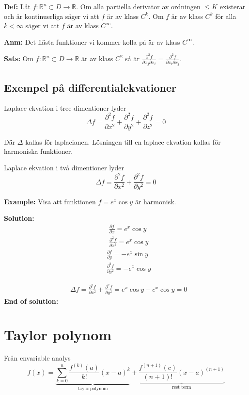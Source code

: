\textbf{Def:} 
Låt $f: \mathbb{R}^n\subset D\to\mathbb{R}$. Om alla 
partiella derivator av ordningen $\leq K$ existerar 
och är kontinuerliga säger vi att $f$ är av klass $C^k$.
Om $f$ är av klass $C^k$ för alla $k<\infty$ säger vi att 
$f$ är av klass $C^\infty$.

\textbf{Anm:} 
Det flästa funktioner vi kommer kolla på är av klass $C^\infty$.

\textbf{Sats:} 
Om $f: \mathbb{R}^n\subset D\to\mathbb{R}$ är av klass $C^2$ 
så är $\frac{\partial^2 f}{\partial x_j\partial x_i} = \frac{\partial^2 f}{\partial x_i\partial x_j}$.

\subsection{Exempel på differentialekvationer}
Laplace ekvation i tree dimentioner lyder
\begin{equation*}
    \Delta f = \frac{\partial^2 f}{\partial x^2} + \frac{\partial^2 f}{\partial y^2} + \frac{\partial^2 f}{\partial z^2} = 0
\end{equation*}

Där $\Delta$ kallas för laplacianen.
Lösningen till en laplace ekvation kallas för harmoniska 
funktioner.

Laplace ekvation i två dimentioner lyder
\begin{equation*}
    \Delta f = \frac{\partial^2 f}{\partial x^2} + \frac{\partial^2 f}{\partial y^2} = 0
\end{equation*}

\textbf{Example:} 
Visa att funktionen $f = e^x \cos{y}$ är harmonisk.

\textbf{Solution:} 
\begin{align*}
    &\frac{\partial f}{\partial x} = e^x \cos{y} \\
    &\frac{\partial^2 f}{\partial x^2} = e^x \cos{y}
\end{align*}
\begin{align*}
    &\frac{\partial f}{\partial y} = -e^x \sin{y} \\
    &\frac{\partial^2 f}{\partial y^2} = -e^x \cos{y}
\end{align*}

\begin{align*}
    &\Delta f = \frac{\partial^2 f}{\partial x^2} + \frac{\partial^2 f}{\partial y^2} 
    = e^x \cos{y} -e^x \cos{y} =0
\end{align*}
\textbf{End of solution:} 


\section{Taylor polynom}
Från envariable analys 
\begin{equation*}
    f(x) = \underbrace{\sum^{n}_{k=0} \frac{f^{(k)}(a)}{k!}(x-a)^k}_{\text{taylorpolynom}} + \underbrace{\frac{f^{(n+1)}(c)}{(n+1)!}(x-a)^{(n+1)}}_{\text{rest term}} 
\end{equation*}

